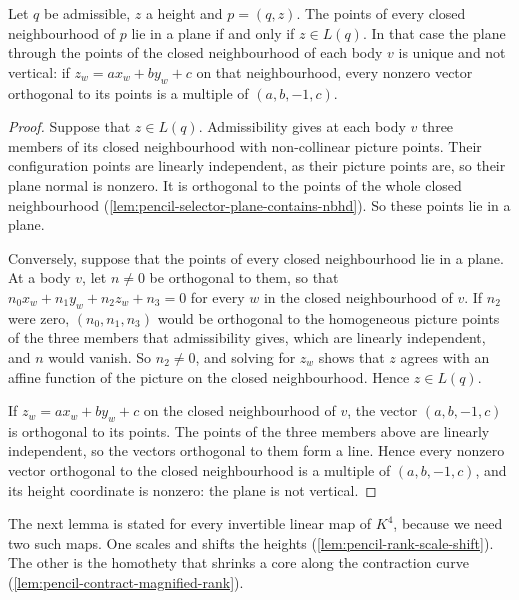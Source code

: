 \begin{lemma}
  \label{lem:pencil-condition-linear}
  \leanok
  Let $q$ be admissible, $z$ a height and $p = (q, z)$. The points of
  every closed neighbourhood of $p$ lie in a plane if and only if
  $z \in L(q)$. In that case the plane through the points of the closed
  neighbourhood of each body $v$ is unique and not vertical: if
  $z_w = a x_w + b y_w + c$ on that neighbourhood, every nonzero vector
  orthogonal to its points is a multiple of $(a, b, -1, c)$.
\end{lemma}
\begin{proof}
  \leanok
  Suppose that $z \in L(q)$. Admissibility gives at each body $v$ three
  members of its closed neighbourhood with non-collinear picture points.
  Their configuration points are linearly independent, as their picture
  points are, so their plane normal is nonzero. It is orthogonal to the
  points of the whole closed neighbourhood
  (\cref{lem:pencil-selector-plane-contains-nbhd}). So these points lie
  in a plane.

  Conversely, suppose that the points of every closed neighbourhood lie
  in a plane. At a body $v$, let $n \neq 0$ be orthogonal to them, so
  that $n_0 x_w + n_1 y_w + n_2 z_w + n_3 = 0$ for every $w$ in the
  closed neighbourhood of $v$. If $n_2$ were zero, $(n_0, n_1, n_3)$
  would be orthogonal to the homogeneous picture points of the three
  members that admissibility gives, which are linearly independent, and
  $n$ would vanish. So $n_2 \neq 0$, and solving for $z_w$ shows that $z$
  agrees with an affine function of the picture on the closed
  neighbourhood. Hence $z \in L(q)$.

  If $z_w = a x_w + b y_w + c$ on the closed neighbourhood of $v$, the
  vector $(a, b, -1, c)$ is orthogonal to its points. The points of the
  three members above are linearly independent, so the vectors orthogonal
  to them form a line. Hence every nonzero
  vector orthogonal to the closed neighbourhood is a multiple of
  $(a, b, -1, c)$, and its height coordinate is nonzero: the plane is not
  vertical.
\end{proof}

The next lemma is stated for every invertible linear map of $K^4$,
because we need two such maps. One scales and shifts the heights
(\cref{lem:pencil-rank-scale-shift}). The other is the homothety that
shrinks a core along the contraction curve
(\cref{lem:pencil-contract-magnified-rank}).

